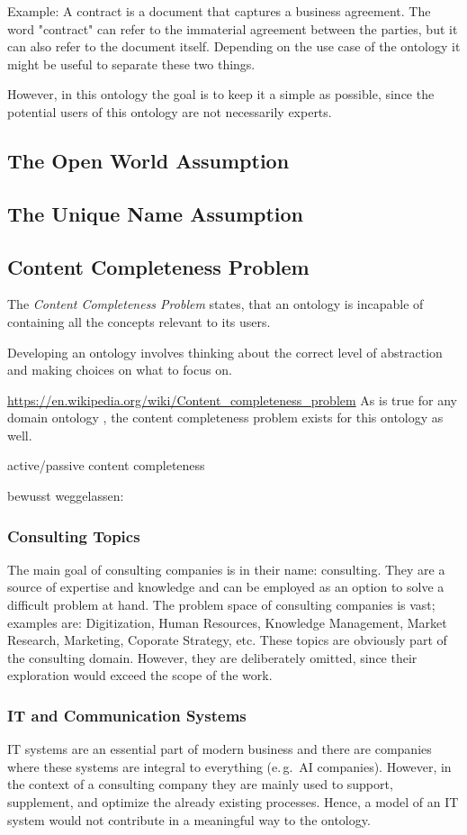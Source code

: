 \documentclass[a4paper, DIV=13, BCOR=0cm]{scrbook}
\newcommand{\eg}{e.\,g.\ }
\begin{document}
Example: A contract is a document that captures a business agreement. The word "contract" can refer to the immaterial agreement between the parties, but it can also refer to the document itself. Depending on the use case of the ontology it might be useful to separate these two things.

However, in this ontology the goal is to keep it a simple as possible, since the potential users of this ontology are not necessarily experts.

\subsection{The Open World Assumption}
\subsection{The Unique Name Assumption}
\subsection{Content Completeness Problem}
The \textit{Content Completeness Problem} states, that an ontology is incapable of containing all the concepts relevant to its users. 

Developing an ontology involves thinking about the correct level of abstraction and making choices on what to focus on. 

\url{https://en.wikipedia.org/wiki/Content_completeness_problem}
As is true for any domain ontology \cite{CN}, the content completeness problem exists for this ontology as well.

active/passive content completeness

bewusst weggelassen:
\subsubsection{Consulting Topics}
The main goal of consulting companies is in their name: consulting. They are a source of expertise and knowledge and can be employed as an option to solve a difficult problem at hand. The problem space of consulting companies is vast; examples are: Digitization, Human Resources, Knowledge Management, Market Research, Marketing, Coporate Strategy, etc. These topics are obviously part of the consulting domain. However, they are deliberately omitted, since their exploration would exceed the scope of the work.

\subsubsection{IT and Communication Systems}
IT systems are an essential part of modern business and there are companies where these systems are integral to everything (\eg AI companies). However, in the context of a consulting company they are mainly used to support, supplement, and optimize the already existing processes. Hence, a model of an IT system would not contribute in a meaningful way to the ontology.
\end{document}

